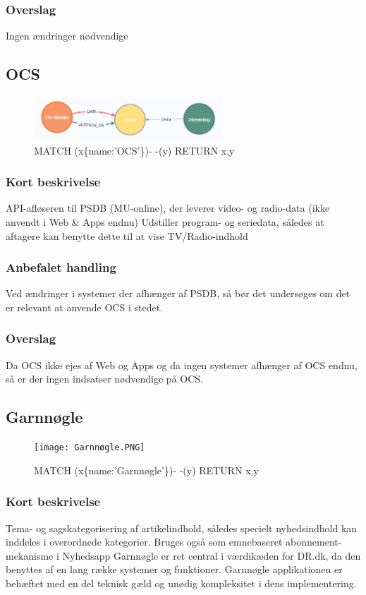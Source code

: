 \documentclass{article}
\begin{document}
\subsubsection{Overslag}
Ingen ændringer nødvendige


\subsection{OCS}
\begin{figure}[h]
\includegraphics[width=200pt]{OCS.PNG}
\caption{MATCH (x\{name:'OCS'\})- -(y) RETURN x,y}
\end{figure}
\subsubsection{Kort beskrivelse}
API-afløseren til PSDB (MU-online), der leverer video- og radio-data (ikke anvendt i Web \& Apps endnu)	Udstiller program- og seriedata, således at aftagere kan benytte dette til at vise TV/Radio-indhold
\subsubsection{Anbefalet handling}
Ved ændringer i systemer der afhænger af PSDB, så bør det undersøges om det er relevant at anvende OCS i stedet.
\subsubsection{Overslag}
Da OCS ikke ejes af Web og Apps og da ingen systemer afhænger af OCS endnu, så er der ingen indsatser nødvendige på OCS.


\subsection{Garnnøgle}
\begin{figure}[h]
\texttt{[image: Garnnøgle.PNG]}
\caption{MATCH (x\{name:'Garnnøgle'\})- -(y) RETURN x,y}
\end{figure}
\subsubsection{Kort beskrivelse}
Tema- og sagskategorisering af artikelindhold, således specielt nyhedsindhold kan inddeles i overordnede kategorier. Bruges også som emnebaseret abonnement-mekanisme i Nyhedsapp
Garnnøgle er ret central i værdikæden for DR.dk, da den benyttes af en lang række systemer og funktioner. Garnnøgle applikationen er behæftet med en del teknisk gæld og unødig kompleksitet i dens implementering.
\end{document}
